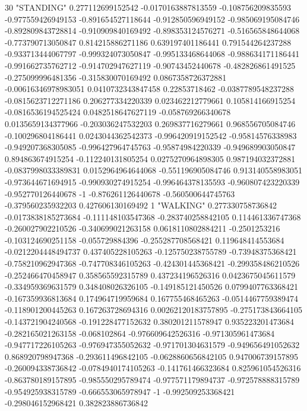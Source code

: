 30 "STANDING" 0.277112699152542 -0.0170163887813559 -0.108756209835593 -0.977559426949153 -0.891654527118644 -0.912850596949152 -0.985069195084746 -0.892809843728814 -0.910909840169492 -0.898353124576271 -0.516565848644068 -0.773790713050847 0.814215886271186 0.639197401186441 0.791544264237288 -0.933713444067797 -0.999324073050847 -0.995133468644068 -0.988634171186441 -0.991662735762712 -0.914702947627119 -0.90743452440678 -0.482826861491525 -0.275099996481356 -0.315830070169492 0.0867358726372881 -0.00616346978983051 0.0410732343847458 0.22853718462 -0.0387789548237288 -0.0815623712271186 0.206277334220339 0.023462212779661 0.105814166915254 -0.0816536194525424 0.0482518647627119 -0.058769266340678 0.0135659134377966 -0.203036247532203 0.269837716279661 0.968556705084746 -0.100296804186441 0.0243044362542373 -0.996420919152542 -0.95814576338983 -0.949207368305085 -0.996427964745763 -0.95874984220339 -0.949689903050847 0.894863674915254 -0.112240131805254 0.0275270964898305 0.987194032372881 -0.0837998033389831 0.0152964964644068 -0.551196905084746 0.913140558983051 -0.973644671694915 -0.990930274915254 -0.996464378135593 -0.960807423220339 -0.952770126440678 -1 -0.876261126440678 -0.560500644745763 -0.379560235932203 0.427606130169492
1 "WALKING" 0.277330758736842 -0.0173838185273684 -0.111148103547368 -0.283740258842105 0.114461336747368 -0.260027902210526 -0.340699021263158 0.0618110802884211 -0.2501253216 -0.103124690251158 -0.055729884396 -0.255287708568421 0.119648414553684 -0.0212204448494737 0.437405228105263 -0.125750238755789 -0.73948375368421 -0.758210962947368 -0.747708346105263 -0.424301445368421 -0.299358486210526 -0.252466470458947 0.358565592315789 0.437234196526316 0.0423675045611579 -0.334959369631579 0.348408026326105 -0.149185121450526 0.0799407763368421 -0.167359936813684 0.174964719959684 0.167755468465263 -0.0514467759389474 -0.118901200445263 0.167263728694316 0.00262120183757895 -0.275173843664105 -0.143721904240568 -0.191228477152632 0.380201211578947 0.935223201473684 -0.282165021263158 -0.068102864 -0.976609642526316 -0.971305961473684 -0.947717226105263 -0.976947355052632 -0.971701304631579 -0.949656491052632 0.868920798947368 -0.293611496842105 -0.0628860656842105 0.947006739157895 -0.260094338736842 -0.0784940174105263 -0.141761466323684 0.825961054526316 -0.863780189157895 -0.985550295789474 -0.977571179894737 -0.972578888315789 -0.954925938315789 -0.666553065978947 -1 -0.992509253368421 -0.298046152968421 0.382823886736842
